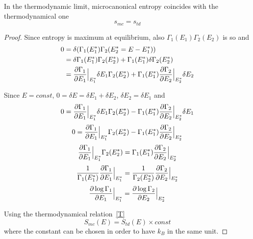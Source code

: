     In the thermodynamic limit, microcanonical entropy coincides with the thermodynamical one 
    \begin{equation*}
        s_{mc} = s_{td}
    \end{equation*}

    \begin{proof}
        Since entropy is maximum at equilibrium, also $\Gamma_1(E_1) \Gamma_2(E_2)$ is so and
        \begin{equation*}
        \begin{aligned}
            0 & = \delta (\Gamma_1(E^*_1) \Gamma_2(E^*_2 = E - E^*_1)) \\ & = \delta \Gamma_1(E^*_1) \Gamma_2 (E^*_2) + \Gamma_1(E^*_1) \delta \Gamma_2 (E^*_2) \\ & = \frac{\partial\Gamma_1}{\partial E_1} \Big\vert_{E^*_1} \delta E_1 \Gamma_2 (E^*_2) + \Gamma_1(E^*_1) \frac{\partial\Gamma_2}{\partial E_2} \Big\vert_{E^*_2} \delta E_2 
        \end{aligned}
        \end{equation*}

        Since $E = const$, $0 = \delta E = \delta E_1 + \delta E_2$, $\delta E_2 = \delta E_1$ and
        \begin{equation*}
            0 = \frac{\partial\Gamma_1}{\partial E_1} \Big\vert_{E^*_1} \delta E_1 \Gamma_2 (E^*_2) - \Gamma_1(E^*_1) \frac{\partial\Gamma_2}{\partial E_2} \Big\vert_{E^*_2} \delta E_1 
        \end{equation*}
        \begin{equation*}
            0 = \frac{\partial\Gamma_1}{\partial E_1} \Big\vert_{E^*_1} \Gamma_2 (E^*_2) - \Gamma_1(E^*_1) \frac{\partial\Gamma_2}{\partial E_2} \Big\vert_{E^*_2} 
        \end{equation*}
        \begin{equation*}
            \frac{\partial\Gamma_1}{\partial E_1} \Big\vert_{E^*_1} \Gamma_2 (E^*_2) = \Gamma_1(E^*_1) \frac{\partial\Gamma_2}{\partial E_2} \Big\vert_{E^*_2} 
        \end{equation*}
        \begin{equation*}
            \frac{1}{\Gamma_1 (E^*_1)} \frac{\partial\Gamma_1}{\partial E_1} \Big\vert_{E^*_1} = \frac{1}{\Gamma_2 (E^*_2)} \frac{\partial\Gamma_2}{\partial E_2} \Big\vert_{E^*_2} 
        \end{equation*}
        \begin{equation*}
            \frac{\partial\log \Gamma_1}{\partial E_1} \Big\vert_{E^*_1} = \frac{\partial\log \Gamma_2}{\partial E_2} \Big\vert_{E^*_2} 
        \end{equation*}

        Using the thermodynamical relation~\eqref{T}
        \begin{equation*}
            S_{mc} (E) = S_{td} (E) \times const
        \end{equation*}
        where the constant can be chosen in order to have $k_B$ in the same unit.
    \end{proof}

